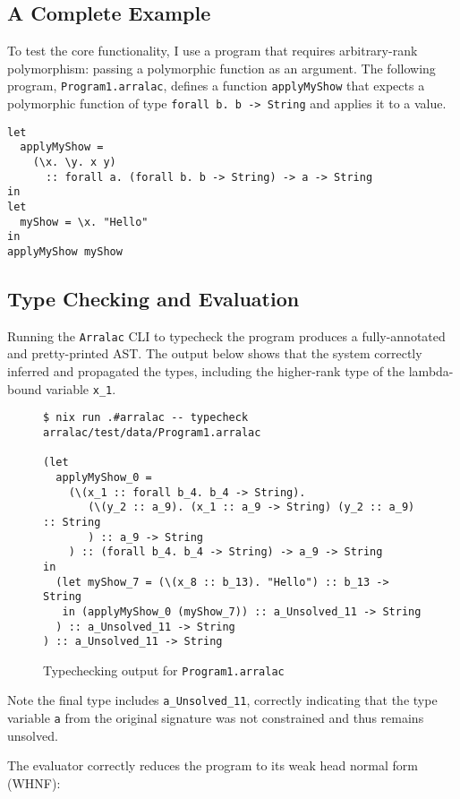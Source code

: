 \subsection{A Complete Example}
To test the core functionality, I use a program that requires arbitrary-rank polymorphism: passing a polymorphic function as an argument. The following program, \texttt{Program1.arralac}, defines a function \texttt{applyMyShow} that expects a polymorphic function of type \texttt{forall b. b -> String} and applies it to a value.

\begin{verbatim}
let
  applyMyShow =
    (\x. \y. x y)
      :: forall a. (forall b. b -> String) -> a -> String
in
let
  myShow = \x. "Hello"
in
applyMyShow myShow
\end{verbatim}

\subsection{Type Checking and Evaluation}
Running the \texttt{Arralac} CLI to typecheck the program produces a fully-annotated and pretty-printed AST. The output below shows that the system correctly inferred and propagated the types, including the higher-rank type of the lambda-bound variable \texttt{x\_1}.

\begin{figure}[h]
    \centering
    \begin{verbatim}
$ nix run .#arralac -- typecheck arralac/test/data/Program1.arralac

(let
  applyMyShow_0 = 
    (\(x_1 :: forall b_4. b_4 -> String).
       (\(y_2 :: a_9). (x_1 :: a_9 -> String) (y_2 :: a_9) :: String
       ) :: a_9 -> String
    ) :: (forall b_4. b_4 -> String) -> a_9 -> String
in
  (let myShow_7 = (\(x_8 :: b_13). "Hello") :: b_13 -> String
   in (applyMyShow_0 (myShow_7)) :: a_Unsolved_11 -> String
  ) :: a_Unsolved_11 -> String
) :: a_Unsolved_11 -> String
\end{verbatim}
    \caption{Typechecking output for \texttt{Program1.arralac}}
\end{figure}

Note the final type includes \texttt{a\_Unsolved\_11}, correctly indicating that the type variable \texttt{a} from the original signature was not constrained and thus remains unsolved.

The evaluator correctly reduces the program to its weak head normal form (WHNF):


